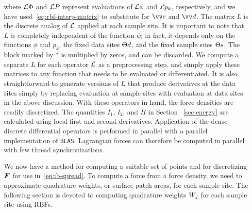 where $\mathcal{L}\Phi$ and $\mathcal{L} P$ represent evaluations of $\mathcal{L}\phi$ and $\mathcal{L} p_k$, respectively,
and we have used~\eqref{eq:rbf-interp-matrix} to substitute for $\arr{c}$ and $\arr{d}$.
The matrix $L$ is the discrete analog of $\mathcal{L}$ applied at each sample site. It is
important to note that $L$ is completely independent of the function $\psi$; in fact, it
depends only on the functions $\phi$ and $p_k$, the fixed data sites $\data\sites$, and
the fixed sample sites $\sample\sites$.  The block marked by $\ast$ is multiplied by
zeros, and can be discarded. We compute a separate $L$ for each operator $\mathcal{L}$ as a
preprocessing step, and simply apply these matrices to any function that needs to be
evaluated or differentiated. It is also straightforward to generate versions of $L$ that
produce derivatives at the data sites simply by replacing evaluation at sample sites with
evaluation at data sites in the above discussion. With these operators in hand, the force
densities are readily discretized. The quantities $I_1$, $I_2$, and $H$ in Section~%
\ref{sec:energy} are calculated using local first and second derivatives. Application of
the dense discrete differential operators is performed in parallel with a parallel
implementation of \texttt{BLAS}. Lagrangian forces can therefore be computed in parallel
with few thread synchronizations.

We now have a method for computing a suitable set of points and for discretizing $\boldsymbol{F}$ for
use in~\eqref{eq:ib-spread}. To compute a force from a force density, we need to
approximate quadrature weights, or surface patch areas, for each sample site. The
following section is devoted to computing quadrature weights $\weight[j]$ for each
sample site using RBFs.

